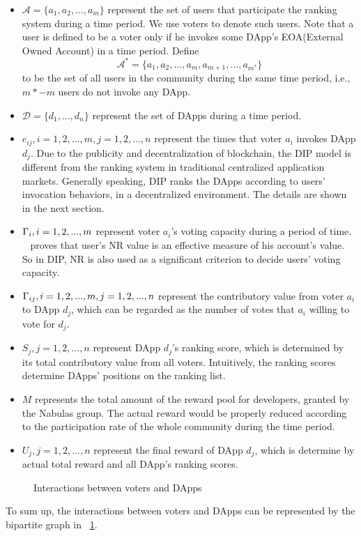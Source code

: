 \begin{itemize}
	\item $\mathcal{A}=\{a_1,a_2,...,a_m\}$ represent the set of users that participate the ranking system during a time period. We use voters to denote such users. Note that a user is defined to be a voter only if he invokes some DApp's EOA(External Owned Account) in a time period. Define $$\mathcal{A}^*=\{a_1,a_2,...,a_m,a_{m+1},...,a_{m^*}\}$$
	to be the set of all users in the community during the same time period, i.e., $m*-m$ users do not invoke any DApp. 	
  \item $\mathcal{D}=\{d_1,...,d_n\}$ represent the set of DApps during a time period.
  \item $e_{ij},i=1,2,...,m, j=1,2,...,n$ represent the times that voter $a_i$ invokes DApp $d_j$. Due to the publicity and decentralization of blockchain, the DIP model is different from the ranking system in traditional centralized application markets. Generally speaking, DIP ranks the DApps according to users' invocation behaviors, in a decentralized environment. The details are shown in the next section.
  
  \item $\Gamma_i, i=1,2,...,m$ represent voter $a_i$'s voting capacity during a period of time.
  ~\cite{Nebulasyellowpaper} proves that user's NR value is an effective measure of his account's value. So in DIP, NR is also used as a significant criterion to decide users' voting capacity.	
  \item $\Gamma_{ij}, i=1,2,...,m,j=1,2,...,n$ represent the contributory value from voter $a_i$ to DApp $d_j$, which can be regarded as the number of votes that $a_i$ willing to vote for $d_j$.
  
  \item $S_j, j=1,2,...,n$ represent DApp $d_j$'s ranking score, which is determined by its total contributory value from all voters. Intuitively, the ranking scores determine DApps' positions on the ranking list. 
  
  	\item $M$ represents the total amount of the reward pool for developers, granted by the Nabulas group.  The actual reward would be properly reduced according to the participation rate of the whole community during the time period. 
   \item $U_j, j=1,2,...,n$ represent the final reward of DApp $d_j$, which is determine by actual total reward and all DApp's ranking scores. 
 \end{itemize}
   \begin{figure}
   	\centering
   	
   	\caption{Interactions between voters and DApps \label{fig:interact}}
   \end{figure}
  To sum up, the interactions between voters and DApps can be represented by the bipartite graph in ~\ref{fig:interact}.
  
